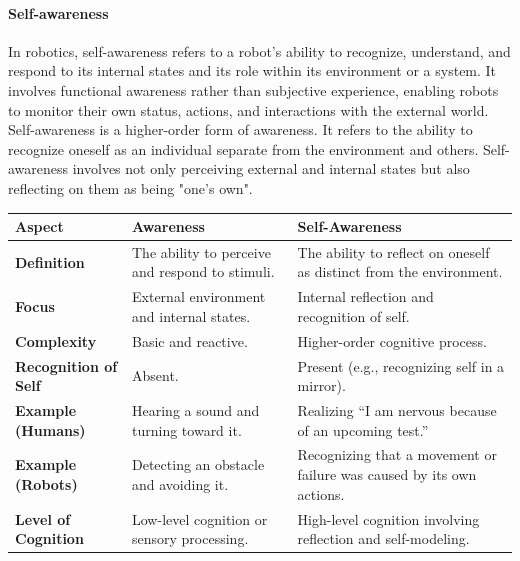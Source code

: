 \documentclass{book}
\begin{document}
\paragraph{Self-awareness}
In robotics, self-awareness refers to a robot's ability to recognize, understand, and respond to its internal states and its role within its environment or a system. It involves functional awareness rather than subjective experience, enabling robots to monitor their own status, actions, and interactions with the external world. Self-awareness is a higher-order form of awareness. It refers to the ability to recognize oneself as an individual separate from the environment and others. Self-awareness involves not only perceiving external and internal states but also reflecting on them as being "one's own".
\begin{tabular}{|l|l|l|}
    \hline
    \textbf{Aspect}              & \textbf{Awareness}                              & \textbf{Self-Awareness}                                               \\ \hline
    \textbf{Definition}          & The ability to perceive and respond to stimuli. & The ability to reflect on oneself as distinct from the environment.   \\ \hline
    \textbf{Focus}               & External environment and internal states.       & Internal reflection and recognition of self.                          \\ \hline
    \textbf{Complexity}          & Basic and reactive.                             & Higher-order cognitive process.                                       \\ \hline
    \textbf{Recognition of Self} & Absent.                                         & Present (e.g., recognizing self in a mirror).                         \\ \hline
    \textbf{Example (Humans)}    & Hearing a sound and turning toward it.          & Realizing “I am nervous because of an upcoming test.”                 \\ \hline
    \textbf{Example (Robots)}    & Detecting an obstacle and avoiding it.          & Recognizing that a movement or failure was caused by its own actions. \\ \hline
    \textbf{Level of Cognition}  & Low-level cognition or sensory processing.      & High-level cognition involving reflection and self-modeling.          \\ \hline
\end{tabular}
\end{document}

